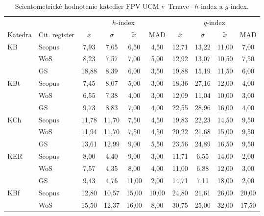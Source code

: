 \begin{table}
  \centering\small
  \caption[Hodnotenie FPV\,--\,$h$-index a $g$-index]%
  {Scientometrické hodnotenie katedier FPV UCM v~Trnave\,--\,$h$-index a $g$-index.}
  \label{tab:3-staff.results}
  \begin{tabularx}{\textwidth}{XXcccc@{\hspace{3ex}}cccc}
    \toprule\noalign{\vspace{.3ex}}
    & & \multicolumn{4}{c}{$h$-index} & \multicolumn{4}{c}{$g$-index} \\
    \cmidrule{3-6}\cmidrule{7-10}
    Katedra & Cit. register & $\bar{x}$ & $\sigma$ & $\tilde{x}$ & MAD & $\bar{x}$ & $\sigma$ & $\tilde{x}$ & MAD \\[0.3ex]
    \midrule\noalign{\vspace{.5ex}}
    KB   & Scopus & 7,93  & 7,65  & 6,50  & 4,50  & 12,71 & 13,22 & 11,00 & 7,00  \\
         & WoS    & 8,23  & 7,57  & 7,00  & 5,00  & 12,92 & 13,07 & 10,50 & 7,50  \\
         & GS     & 18,88 & 8,39  & 6,00  & 3,50  & 19,88 & 15,19 & 11,50 & 6,00  \\[3ex]
    KBt  & Scopus & 7,45  & 8,07  & 5,00  & 3,00  & 18,36 & 27,16 & 12,00 & 4,00  \\
         & WoS    & 6,55  & 7,38  & 4,00  & 3,00  & 12,09 & 11,04 & 10,00 & 3,00  \\
         & GS     & 9,73  & 8,83  & 7,00  & 4,00  & 22,55 & 28,96 & 16,00 & 4,00  \\[3ex]
    KCh  & Scopus & 11,78 & 11,70 & 7,50  & 4,50  & 19,83 & 22,23 & 14,50 & 9,50  \\
         & WoS    & 11,94 & 11,70 & 7,50  & 4,50  & 20,22 & 21,68 & 15,00 & 9,50  \\
         & GS     & 13,61 & 12,99 & 9,00  & 5,50  & 23,56 & 24,89 & 16,50 & 9,50  \\[3ex]
    KER  & Scopus & 8,00  & 4,40  & 9,00  & 3,00  & 11,71 & 6,55  & 14,00 & 2,00  \\
         & WoS    & 7,57  & 4,35  & 8,00  & 4,00  & 11,00 & 6,88  & 12,00 & 3,00  \\
         & GS     & 9,43  & 4,76  & 11,00 & 2,00  & 14,71 & 7,11  & 18,00 & 2,00  \\[3ex]
    KBf  & Scopus & 12,80 & 10,57 & 15,00 & 10,00 & 24,80 & 21,61 & 26,00 & 20,00 \\
         & WoS    & 15,50 & 12,37 & 16,00 & 8,00  & 30,75 & 25,00 & 32,00 & 17,50 \\

\end{tabularx}
\end{table}
